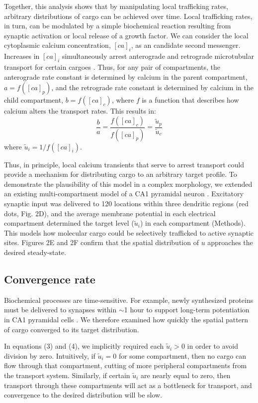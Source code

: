 \documentclass[11pt]{wlpeerj}
\begin{document}
Together, this analysis shows that by manipulating local trafficking rates, arbitrary distributions of cargo can be achieved over time. Local trafficking rates, in turn, can be modulated by a simple biochemical reaction resulting from synaptic activation or local release of a growth factor. We can consider the local cytoplasmic calcium concentration, $[ca]_i$, as an candidate second messenger. Increases in $[ca]_i$ simultaneously arrest anterograde and retrograde microtubular transport for certain cargoes \citep{Wang_2009}. Thus, for any pair of compartments, the anterograde rate constant is determined by calcium in the parent compartment, $a = f([ca]_p)$,  and the retrograde rate constant is determined by calcium in the child compartment, $b = f([ca]_c)$, where $f$ is a function that describes how calcium alters the transport rates. This results in:
\begin{equation}
\frac{b}{a} = \frac{f([ca]_c)}{f([ca]_p)} = \frac{\tilde{u}_p}{\tilde{u}_c}
\end{equation}
where $\tilde{u}_i = 1/f([ca]_i)$.

Thus, in principle, local calcium transients that serve to arrest transport could provide a mechanism for distributing cargo to an arbitrary target profile.
To demonstrate the plausibility of this model in a complex morphology, we extended an existing multi-compartment model of a CA1 pyramidal neuron \citep{Migliore_2012}. Excitatory synaptic input was delivered to 120 locations within three dendritic regions (red dots, Fig. 2D), and the average membrane potential in each electrical compartment determined the target level ($\tilde{u}_i$) in each compartment (Methods). This models how molecular cargo could be selectively trafficked to active synaptic sites. Figures 2E and 2F confirm that the spatial distribution of $u$ approaches the desired steady-state.

\subsection*{Convergence rate}

Biochemical processes are time-sensitive.
For example, newly synthesized proteins must be delivered to synapses within $\sim$1 hour to support long-term potentiation in CA1 pyramidal cells \citep{Frey_1997,Frey_1998}.
We therefore examined how quickly the spatial pattern of cargo converged to its target distribution.

In equations (3) and (4), we implicitly required each $\tilde{u}_i > 0$ in order to avoid division by zero.
Intuitively, if $\tilde{u}_i = 0$ for some compartment, then no cargo can flow through that compartment, cutting of more peripheral compartments from the transport system.
Similarly, if certain $\tilde{u}_i$ are nearly equal to zero, then transport through these compartments will act as a bottleneck for transport, and convergence to the desired distribution will be slow.
\end{document}
